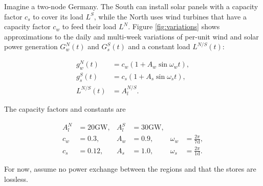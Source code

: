\documentclass[11pt,a4paper,fleqn]{scrartcl}
\begin{document}
Imagine a two-node Germany. The South can install solar panels with a capacity factor $c_s$ to cover its load $L^S$, while the North uses wind turbines that have a capacity factor $c_w$
to feed their load $L^N$. Figure \ref{fig:variations} shows approximations to the daily and multi-week variations of per-unit wind and solar power generation \(G^{N}_{w}(t)\) and \(G^{S}_{s}(t)\) and a constant load \(L^{N/S}(t)\):

\vspace{-0.5em}

\begin{align*}
 g_{w}^N(t) & = c_w(1+A_w \sin \omega_w t), \\
 g_{s}^S(t) & = c_s(1+A_s \sin \omega_s t), \\
 L^{N/S}(t) & = A_{l}^{N/S}.
\end{align*}

The capacity factors and constants are

\begin{align*}
 A_{l}^{N} & = 20 \si{\giga\watt}, & A_{l}^{S} & = 30 \si{\giga\watt},                                         \\
 c_w    & = 0.3,                & A_w     & = 0.9,                & \omega_w & = \frac{2\pi}{7 \text{d}}, \\
 c_s    & = 0.12,               & A_s     & = 1.0,                & \omega_s & = \frac{2\pi}{1 \text{d}}.
\end{align*}

For now, assume no power exchange between the regions and that the stores are lossless.
\end{document}
